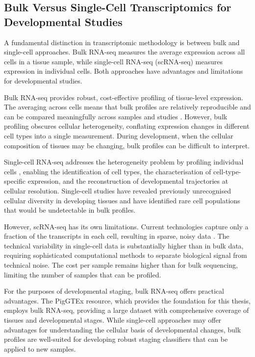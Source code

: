 \subsection{Bulk Versus Single-Cell Transcriptomics for Developmental Studies}

A fundamental distinction in transcriptomic methodology is between bulk and single-cell approaches. Bulk RNA-seq measures the average expression across all cells in a tissue sample, while single-cell RNA-seq (scRNA-seq) measures expression in individual cells. Both approaches have advantages and limitations for developmental studies.

Bulk RNA-seq provides robust, cost-effective profiling of tissue-level expression. The averaging across cells means that bulk profiles are relatively reproducible and can be compared meaningfully across samples and studies \parencite{li_bulk_2021}. However, bulk profiling obscures cellular heterogeneity, conflating expression changes in different cell types into a single measurement. During development, when the cellular composition of tissues may be changing, bulk profiles can be difficult to interpret.

Single-cell RNA-seq addresses the heterogeneity problem by profiling individual cells \parencite{schaum_single-cell_2018}, enabling the identification of cell types, the characterisation of cell-type-specific expression, and the reconstruction of developmental trajectories at cellular resolution. Single-cell studies have revealed previously unrecognised cellular diversity in developing tissues and have identified rare cell populations that would be undetectable in bulk profiles.

However, scRNA-seq has its own limitations. Current technologies capture only a fraction of the transcripts in each cell, resulting in sparse, noisy data \parencite{zheng_measuring_2023, li_bulk_2021}. The technical variability in single-cell data is substantially higher than in bulk data, requiring sophisticated computational methods to separate biological signal from technical noise. The cost per sample remains higher than for bulk sequencing, limiting the number of samples that can be profiled.

For the purposes of developmental staging, bulk RNA-seq offers practical advantages. The PigGTEx resource, which provides the foundation for this thesis, employs bulk RNA-seq, providing a large dataset with comprehensive coverage of tissues and developmental stages. While single-cell approaches may offer advantages for understanding the cellular basis of developmental changes, bulk profiles are well-suited for developing robust staging classifiers that can be applied to new samples.

